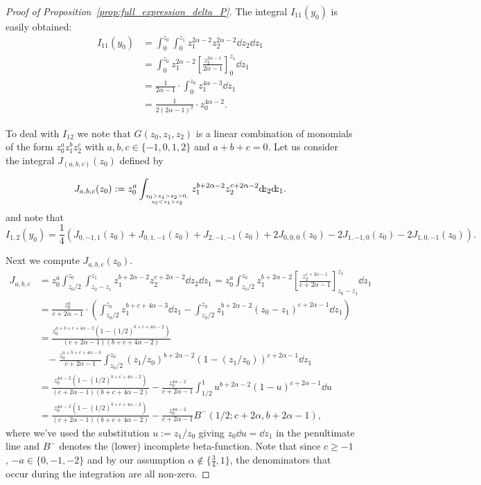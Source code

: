 \begin{proof}[Proof of Proposition~\ref{prop:full_expression_delta_P}]
The integral $I_{11}(y_0)$ is easily obtained:
\begin{align*}
	I_{11}(y_0) &= \int_0^{z_0} \int_0^{z_1} z_1^{2\alpha-2} z_2^{2\alpha-2} {\dd}z_2{\dd}z_1\\
	&= \int_0^{z_0} z_1^{2\alpha-2} \left[ \frac{z_2^{2\alpha-1}}{2\alpha-1} \right]_0^{z_1} {\dd}z_1\\
	&= \frac{1}{2\alpha-1} \cdot \int_0^{z_0} z_1^{4\alpha-3} {\dd}z_1 \\
	&= \frac{1}{2(2\alpha-1)^2} \cdot z_0^{4\alpha-2}.
\end{align*}

To deal with $I_{12}$ we note that $G(z_0,z_1,z_2)$ is a linear combination of monomials of the form $z_0^az_1^bz_2^c$ with 
$a,b,c \in \{-1,0,1,2\}$ and $a+b+c=0$. Let us consider the integral $J_{(a,b,c)}(z_0)$ defined by 

\begin{equation}\label{eq:def_Delta_P_computation_int_J_1}
	J_{a,b,c}(z_0) := z_0^a \int_{{z_0>z_1>z_2>0,}\atop{z_0 < z_1+z_2}} z_1^{b+2\alpha-2} z_2^{c+2\alpha-2} {\operatorname{\mathrm{d}\hspace{-2pt}}}z_2{\operatorname{\mathrm{d}\hspace{-2pt}}}z_1.
\end{equation}
and note that
\begin{equation}\label{eq:Delta_P_computation_I12_with_J}
	I_{1,2}(y_0) = \frac{1}{4} (J_{0,-1,1}(z_0)+J_{0,1,-1}(z_0)+J_{2,-1,-1}(z_0)+2J_{0,0,0}(z_0)-2J_{1,-1,0}(z_0)-2J_{1,0,-1}(z_0)).
\end{equation}

Next we compute $J_{a,b,c}(z_0)$.
\begin{align*}
	J_{a,b,c} 
	&= z_0^a \int_{z_0/2}^{z_0}\int_{z_0-z_1}^{z_1} z_1^{b+2\alpha-2} z_2^{c+2\alpha-2} {\dd}z_2{\dd}z_1
		= z_0^a \int_{z_0/2}^{z_0} z_1^{b+2\alpha-2} \left[ \frac{ z_2^{c+2\alpha-1} }{ c+2\alpha-1 } \right]_{z_0-z_1}^{z_1} \dd z_1\\
	&= \frac{z_0^a}{c+2\alpha-1} \cdot \left( \int_{z_0/2}^{z_0} z_1^{b+c+4\alpha-3} \dd z_1
	   - \int_{z_0/2}^{z_0} z_1^{b+2\alpha-2} (z_0-z_1)^{c+2\alpha-1} {\dd}z_1 \right) \\
	&= \frac{z_0^{a+b+c+4\alpha-2}(1-(1/2)^{b+c+4\alpha-2})}{(c+2\alpha-1)(b+c+4\alpha-2)} \\
	&\hspace{10pt}- \frac{z_0^{a+b+c+4\alpha-3}}{c+2\alpha-1} \int_{z_0/2}^{z_0}  \left(z_1/z_0\right)^{b+2\alpha-2} 
	    \left(1-(z_1/z_0)\right)^{c+2\alpha-1} \dd z_1\\
	&= \frac{z_0^{4\alpha-2}(1-(1/2)^{b+c+4\alpha-2})}{(c+2\alpha-1)(b+c+4\alpha-2)} 
		- \frac{z_0^{4\alpha-2}}{c+2\alpha-1}
	   \int_{1/2}^1  u^{b+2\alpha-2}(1-u)^{c+2\alpha-1} \dd u \\
	&= \frac{z_0^{4\alpha-2}(1-(1/2)^{b+c+4\alpha-2})}{(c+2\alpha-1)(b+c+4\alpha-2)} 
		- \frac{z_0^{4\alpha-2}}{c+2\alpha-1} B^-(1/2;c+2\alpha, b+2\alpha-1),
\end{align*}
where we've used the substitution $u := z_1/z_0$ giving $z_0 {\dd} u = {\dd} z_1$ in the penultimate line and
$B^-$ denotes the (lower) incomplete beta-function. Note that since $c \geq -1$, $-a \in \{0,-1,-2\}$ and by our assumption $\alpha \not \in \{\frac{3}{4},1\}$, the denominators that occur during the integration are all non-zero.


\end{proof}
